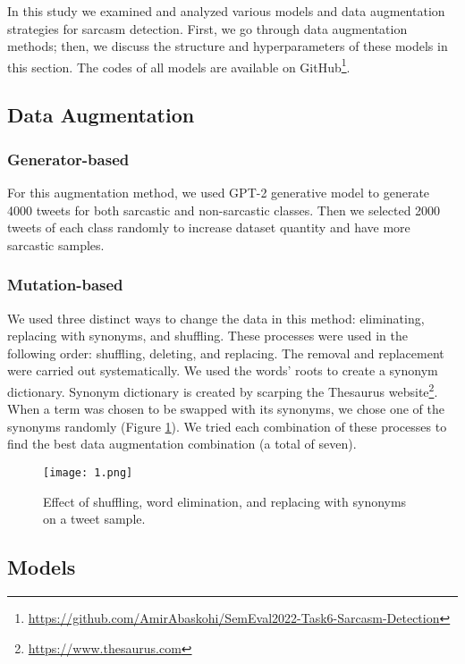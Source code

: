 \documentclass[11pt]{article}
\begin{document}
In this study we examined and analyzed various models and data augmentation strategies for sarcasm detection. First, we go through data augmentation methods; then, we discuss the structure and hyperparameters of these models in this section. The codes of all models are  available on GitHub\footnote{\href{https://github.com/AmirAbaskohi/SemEval2022-Task6-Sarcasm-Detection}{https://github.com/AmirAbaskohi/SemEval2022-Task6-Sarcasm-Detection} }.

\subsection{Data Augmentation}

\subsubsection{Generator-based}
For this augmentation method, we used GPT-2 \cite{radford2019language} generative model to generate 4000 tweets for both sarcastic and non-sarcastic classes. Then we selected 2000 tweets of each class randomly to increase dataset quantity and have more sarcastic samples.

\subsubsection{Mutation-based}
We used three distinct ways to change the data in this method: eliminating, replacing with synonyms, and shuffling. These processes were used in the following order: shuffling, deleting, and replacing. The removal and replacement were carried out systematically. We used the words' roots to create a synonym dictionary. Synonym dictionary is created by scarping the Thesaurus website\footnote{\href{https://www.thesaurus.com}{https://www.thesaurus.com}}. When a term was chosen to be swapped with its synonyms, we chose one of the synonyms randomly (Figure \ref{fig:Mutation-based}). We tried each combination of these processes to find the best data augmentation combination (a total of seven).

\begin{figure}
  \centering
  \texttt{[image: 1.png]}
  \caption{Effect of shuffling, word elimination, and replacing with synonyms on a tweet sample.}
  \label{fig:Mutation-based}
\end{figure}

\subsection{Models}
\end{document}
